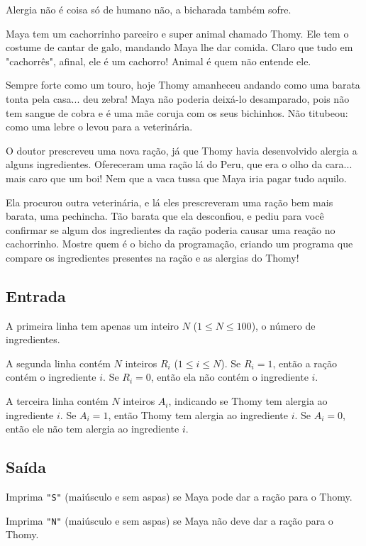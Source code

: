 Alergia não é coisa só de humano não, a bicharada também sofre.

Maya tem um cachorrinho parceiro e super animal chamado Thomy. Ele tem o costume de cantar de galo, mandando Maya lhe dar comida. Claro que tudo em "cachorrês", afinal, ele é um cachorro! Animal é quem não entende ele.

Sempre forte como um touro, hoje Thomy amanheceu andando como uma barata tonta pela casa... deu zebra! Maya não poderia deixá-lo desamparado, pois não tem sangue de cobra e é uma mãe coruja com os seus bichinhos. Não titubeou: como uma lebre o levou para a veterinária.

O doutor prescreveu uma nova ração, já que Thomy havia desenvolvido alergia a alguns ingredientes. Ofereceram uma ração lá do Peru, que era o olho da cara... mais caro que um boi! Nem que a vaca tussa que Maya iria pagar tudo aquilo.

Ela procurou outra veterinária, e lá eles prescreveram uma ração bem mais barata, uma pechincha. Tão barata que ela desconfiou, e pediu para você confirmar se algum dos ingredientes da ração poderia causar uma reação no cachorrinho. Mostre quem é o bicho da programação, criando um programa que compare os ingredientes presentes na ração e as alergias do Thomy!

\subsection*{Entrada}
A primeira linha tem apenas um inteiro $N$ ($1\leq N \leq 100$), o número de ingredientes.

A segunda linha contém $N$ inteiros $R_i$ ($1\leq i \leq N$). Se $R_i=1$, então a ração contém o ingrediente $i$. Se $R_i=0$, então ela não contém o ingrediente $i$.

A terceira linha contém $N$ inteiros $A_i$, indicando se Thomy tem alergia ao ingrediente $i$. Se $A_i=1$, então Thomy tem alergia ao ingrediente $i$. Se $A_i=0$, então ele não tem alergia ao ingrediente $i$.

\subsection*{Saída}
Imprima \texttt{"S"} (maiúsculo e sem aspas) se Maya pode dar a ração para o Thomy.

Imprima \texttt{"N"} (maiúsculo e sem aspas) se Maya não deve dar a ração para o Thomy.

